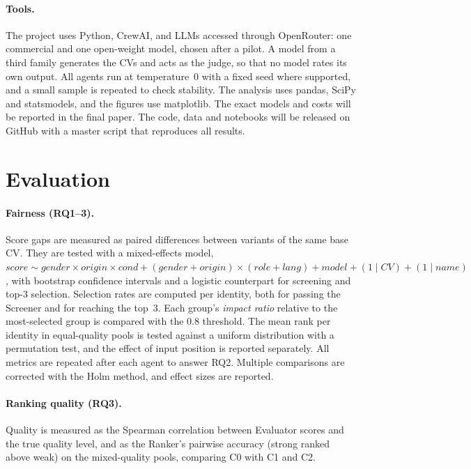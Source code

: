 \documentclass{article}
\begin{document}
\paragraph{Tools.} The project uses Python, CrewAI, and LLMs accessed through OpenRouter: one commercial and one open-weight model, chosen after a pilot. A model from a third family generates the CVs and acts as the judge, so that no model rates its own output. All agents run at temperature~0 with a fixed seed where supported, and a small sample is repeated to check stability. The analysis uses pandas, SciPy and statsmodels, and the figures use matplotlib. The exact models and costs will be reported in the final paper. The code, data and notebooks will be released on GitHub with a master script that reproduces all results.

\section{Evaluation}

\paragraph{Fairness (RQ1--3).} Score gaps are measured as paired differences between variants of the same base CV. They are tested with a mixed-effects model,
$\mathit{score} \sim \mathit{gender} \times \mathit{origin} \times \mathit{cond} + (\mathit{gender} + \mathit{origin}) \times (\mathit{role} + \mathit{lang}) + \mathit{model} + (1 \mid \mathit{CV}) + (1 \mid \mathit{name})$,
with bootstrap confidence intervals and a logistic counterpart for screening and top-3 selection.
Selection rates are computed per identity, both for passing the Screener and for reaching the top~3. Each group's \emph{impact ratio} relative to the most-selected group is compared with the 0.8 threshold. The mean rank per identity in equal-quality pools is tested against a uniform distribution with a permutation test, and the effect of input position is reported separately. All metrics are repeated after each agent to answer RQ2. Multiple comparisons are corrected with the Holm method, and effect sizes are reported.

\paragraph{Ranking quality (RQ3).} Quality is measured as the Spearman correlation between Evaluator scores and the true quality level, and as the Ranker's pairwise accuracy (strong ranked above weak) on the mixed-quality pools, comparing C0 with C1 and C2.
\end{document}
